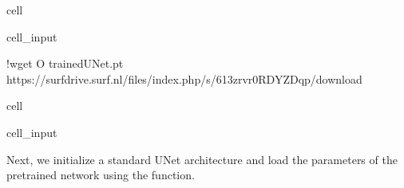 \documentclass[letterpaper,10pt,english]{jupyterBook}
\begin{document}
\begin{sphinxuseclass}{cell}\begin{sphinxVerbatimInput}

\begin{sphinxuseclass}{cell_input}
\begin{sphinxVerbatim}[commandchars=\\\{\}]
!wget \PYGZhy{}O trainedUNet.pt https://surfdrive.surf.nl/files/index.php/s/613zrvr0RDYZDqp/download
\end{sphinxVerbatim}

\end{sphinxuseclass}\end{sphinxVerbatimInput}

\end{sphinxuseclass}
\begin{sphinxuseclass}{cell}\begin{sphinxVerbatimInput}

\begin{sphinxuseclass}{cell_input}
\begin{sphinxVerbatim}[commandchars=\\\{\}]
   
\end{sphinxVerbatim}

\end{sphinxuseclass}\end{sphinxVerbatimInput}

\end{sphinxuseclass}
\sphinxAtStartPar
Next, we initialize a standard U\sphinxhyphen{}Net architecture and load the parameters of the pretrained network using the  function.
\end{document}
